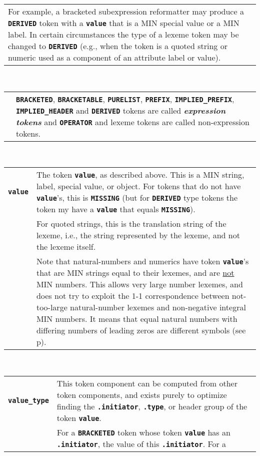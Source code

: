 \documentclass[12pt]{article}
\makeatletter
\newcommand{\TT}[1]{{\tt \bfseries #1}}
\newcommand{\skey}[2]{{\bf \em #1#2}\index{#1}}
\newcommand{\ttmkey}[2]{\TT{#1}\index{#1@\TT{#1}!#2}}
\newcommand{\pagref}[1]{p\pageref{#1}}
\newcommand{\EOL}{\penalty \exhyphenpenalty}
\newenvironment{indpar}[1][0.3in]%
	{\begin{list}{}%
		     {\setlength{\itemsep}{0in}%
		      \setlength{\topsep}{0in}%
		      \setlength{\parsep}{1ex}%
		      \setlength{\labelwidth}{#1}%
		      \setlength{\leftmargin}{#1}%
		      \addtolength{\leftmargin}{\labelsep}}%
	 \item}%
	{\end{list}}
\makeatother
\begin{document}
\begin{indpar}
\begin{tabular}{p{1in}p{4.5in}}
		  For example, a bracketed
		  subexpression reformatter may
		  produce a \TT{DERIVED} token with a \TT{value} that is
		  a MIN special value or a MIN label.  In certain circumstances
		  the type of a lexeme token may be changed to
		  \TT{DERIVED} (e.g., when the token is a quoted string
		  or numeric used as a
		  component of an attribute label or value).
\end{tabular}
\\[1ex]  
\begin{tabular}{p{1in}p{4.5in}}
		& \TT{BRACKETED}, \TT{BRACKETABLE}, \TT{PURELIST}, \TT{PREFIX},
		  \TT{IMPLIED\_\EOL PREFIX}, \TT{IMPLIED\_\EOL HEADER}
		  and \TT{DERIVED}
		  tokens are called
		  \skey{expression token}s and \TT{OPERATOR} and lexeme
		  tokens are called non-expression tokens.
\end{tabular}
\\[1ex]
\begin{tabular}{p{1in}p{4.5in}}
\ttmkey{value}{of token}
		& The token \TT{value}, as described above.  This is
		  a MIN string, label, special value, or object.
		  For tokens that do not have \TT{value}'s, this is \TT{MISSING}
		  (but for \TT{DERIVED} type tokens the token my have
		  a \TT{value} that equals \TT{MISSING}).
\\[1ex]
		& For quoted strings,
                  this is the translation string of the lexeme,
		  i.e., the string represented by the lexeme,
		  and not the lexeme itself.
\\[1ex]
		& Note that natural-numbers and numerics
		  have token \TT{value}'s that are MIN
		  strings equal to their lexemes,
		  and are \underline{not} MIN numbers.
		  This allows very large number lexemes,
		  and does not try to exploit the 1-1 correspondence
		  between not-too-large natural-number lexemes and
		  non-negative integral MIN numbers.  It means that
		  equal natural numbers with differing numbers of
		  leading zeros are different symbols (see \pagref{SYMBOL}).
\end{tabular}
\\[1ex]
\begin{tabular}{p{1in}p{4.5in}}
\ttmkey{value\_type}{of token}
		& This token component can be computed from other
		  token components, and exists purely to optimize finding
		  the \TT{.initiator}, \TT{.type}, or header group
		  of the token \TT{value}.
\\[1ex]
		& For a \TT{BRACKETED} token whose
		  token \TT{value} has an \TT{.ini\-tiator},
		  the value of this \TT{.initiator}.  For a

\end{tabular}
\end{indpar}
\end{document}
